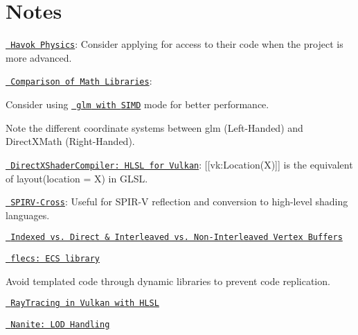\chapter{Notes}
\hypertarget{md_markdown_2_notes}{}\label{md_markdown_2_notes}
\label{md_markdown_2_notes_autotoc_md11}%
%



\begin{DoxyItemize}
\item \href{https://www.havok.com/havok-physics/}{\texttt{ Havok Physics}}\+: Consider applying for access to their code when the project is more advanced.
\item \href{https://bargor.github.io/Comparison-of-3d-math-libraries/}{\texttt{ Comparison of Math Libraries}}\+:
\begin{DoxyItemize}
\item Consider using \href{https://glm.g-truc.net/0.9.1/api/a00002.html}{\texttt{ {\ttfamily glm} with {\ttfamily SIMD}}} mode for better performance.
\item Note the different coordinate systems between {\ttfamily glm} (Left-\/\+Handed) and {\ttfamily Direct\+XMath} (Right-\/\+Handed).
\end{DoxyItemize}
\item \href{https://github.com/microsoft/DirectXShaderCompiler/blob/main/docs/SPIR-V.rst\#hlsl-semantic-and-vulkan-location}{\texttt{ Direct\+XShader\+Compiler\+: HLSL for Vulkan}}\+: {\ttfamily \mbox{[}\mbox{[}vk\+:Location(\+X)\mbox{]}\mbox{]}} is the equivalent of {\ttfamily layout(location = X)} in GLSL.
\item \href{https://github.com/KhronosGroup/SPIRV-Cross}{\texttt{ SPIRV-\/\+Cross}}\+: Useful for {\ttfamily SPIR-\/V} reflection and conversion to high-\/level shading languages.
\item \href{https://stackoverflow.com/questions/17503787/vertex-buffers-indexed-or-direct-interlaced-or-separate}{\texttt{ Indexed vs. Direct \& Interleaved vs. Non-\/\+Interleaved Vertex Buffers}}
\item \href{https://github.com/SanderMertens/flecs}{\texttt{ flecs\+: ECS library}}
\item Avoid templated code through dynamic libraries to prevent code replication.
\item \href{https://github.com/microsoft/DirectXShaderCompiler/blob/9c6b2c1275e41cc385b2034aa2716ec2303a62d6/docs/SPIR-V.rst\#raytracing-in-vulkan-and-spirv}{\texttt{ Ray\+Tracing in Vulkan with HLSL}}
\item \href{https://advances.realtimerendering.com/s2021/Karis_Nanite_SIGGRAPH_Advances_2021_final.pdf}{\texttt{ Nanite\+: LOD Handling}} 
\end{DoxyItemize}
